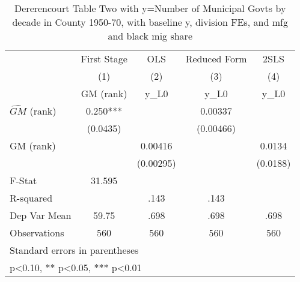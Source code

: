 \begin{table}[htbp]\centering
\def\sym#1{\ifmmode^{#1}\else\(^{#1}\)\fi}
\caption{Dererencourt Table Two with y=Number of Municipal Govts by decade in County 1950-70, with baseline y, division FEs, and mfg and black mig share}
\begin{tabular}{l*{4}{c}}
\toprule
                    & First Stage   &         OLS   &Reduced Form   &        2SLS   \\
                    &\multicolumn{1}{c}{(1)}&\multicolumn{1}{c}{(2)}&\multicolumn{1}{c}{(3)}&\multicolumn{1}{c}{(4)}\\
                    &\multicolumn{1}{c}{GM  (rank)}&\multicolumn{1}{c}{y\_L0}&\multicolumn{1}{c}{y\_L0}&\multicolumn{1}{c}{y\_L0}\\
\midrule
$\hat{GM}$ (rank)   &       0.250***&               &     0.00337   &               \\
                    &    (0.0435)   &               &   (0.00466)   &               \\
\addlinespace
GM  (rank)          &               &     0.00416   &               &      0.0134   \\
                    &               &   (0.00295)   &               &    (0.0188)   \\
\midrule
F-Stat              &      31.595   &               &               &               \\
R-squared           &               &        .143   &        .143   &               \\
Dep Var Mean        &       59.75   &        .698   &        .698   &        .698   \\
Observations        &         560   &         560   &         560   &         560   \\
\bottomrule
\multicolumn{5}{l}{\footnotesize Standard errors in parentheses}\\
\multicolumn{5}{l}{\footnotesize * p<0.10, ** p<0.05, *** p<0.01}\\
\end{tabular}
\end{table}

